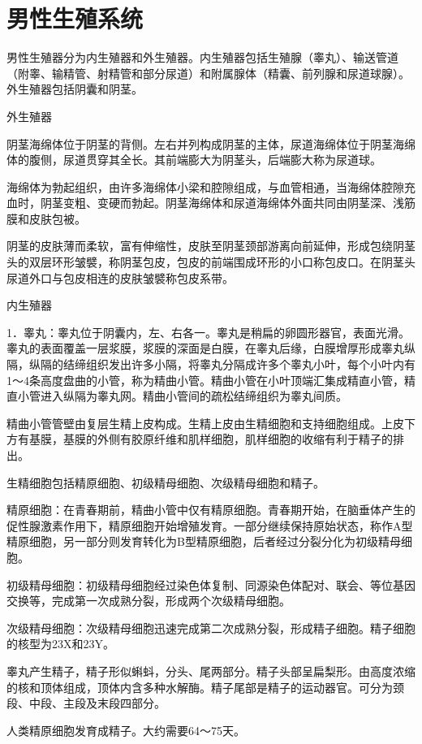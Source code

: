 \documentclass[12pt,UTF8,openany]{ctexbook}
\begin{document}
\chapter{男性生殖系统}

男性生殖器分为内生殖器和外生殖器。内生殖器包括生殖腺（睾丸）、输送管道（附睾、输精管、射精管和部分尿道）和附属腺体（精囊、前列腺和尿道球腺）。外生殖器包括阴囊和阴茎。

外生殖器

阴茎海绵体位于阴茎的背侧。左右并列构成阴茎的主体，尿道海绵体位于阴茎海绵体的腹侧，尿道贯穿其全长。其前端膨大为阴茎头，后端膨大称为尿道球。

海绵体为勃起组织，由许多海绵体小梁和腔隙组成，与血管相通，当海绵体腔隙充血时，阴茎变粗、变硬而勃起。阴茎海绵体和尿道海绵体外面共同由阴茎深、浅筋膜和皮肤包被。

阴茎的皮肤薄而柔软，富有伸缩性，皮肤至阴茎颈部游离向前延伸，形成包绕阴茎头的双层环形皱襞，称阴茎包皮，包皮的前端围成环形的小口称包皮口。在阴茎头尿道外口与包皮相连的皮肤皱襞称包皮系带。

内生殖器

1．睾丸：睾丸位于阴囊内，左、右各一。睾丸是稍扁的卵圆形器官，表面光滑。睾丸的表面覆盖一层浆膜，浆膜的深面是白膜，在睾丸后缘，白膜增厚形成睾丸纵隔，纵隔的结缔组织发出许多小隔，将睾丸分隔成许多个睾丸小叶，每个小叶内有1～4条高度盘曲的小管，称为精曲小管。精曲小管在小叶顶端汇集成精直小管，精直小管进入纵隔为睾丸网。精曲小管间的疏松结缔组织为睾丸间质。

精曲小管管壁由复层生精上皮构成。生精上皮由生精细胞和支持细胞组成。上皮下方有基膜，基膜的外侧有胶原纤维和肌样细胞，肌样细胞的收缩有利于精子的排出。

生精细胞包括精原细胞、初级精母细胞、次级精母细胞和精子。

精原细胞：在青春期前，精曲小管中仅有精原细胞。青春期开始，在脑垂体产生的促性腺激素作用下，精原细胞开始增殖发育。一部分继续保持原始状态，称作A型精原细胞，另一部分则发育转化为B型精原细胞，后者经过分裂分化为初级精母细胞。

初级精母细胞：初级精母细胞经过染色体复制、同源染色体配对、联会、等位基因交换等，完成第一次成熟分裂，形成两个次级精母细胞。

次级精母细胞：次级精母细胞迅速完成第二次成熟分裂，形成精子细胞。精子细胞的核型为23X和23Y。

睾丸产生精子，精子形似蝌蚪，分头、尾两部分。精子头部呈扁梨形。由高度浓缩的核和顶体组成，顶体内含多种水解酶。精子尾部是精子的运动器官。可分为颈段、中段、主段及末段四部分。

人类精原细胞发育成精子。大约需要64～75天。
\end{document}
